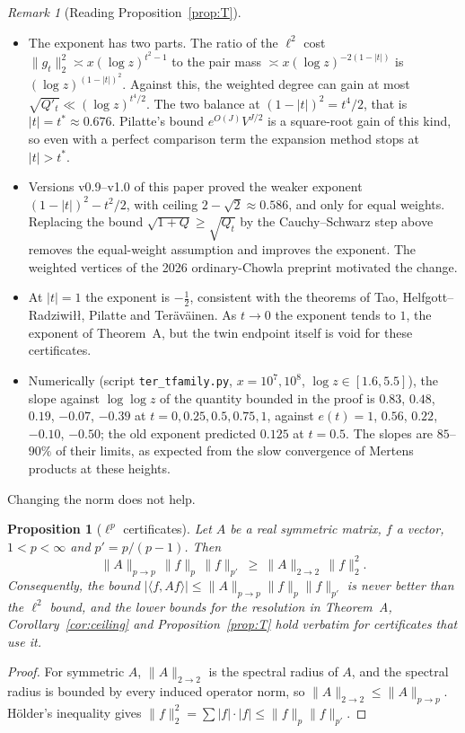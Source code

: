 \documentclass[11pt]{amsart}
\newtheorem{proposition}[theorem]{Proposition}
\theoremstyle{definition}
\theoremstyle{remark}
\newtheorem{remark}[theorem]{Remark}
\begin{document}
\begin{remark}[Reading Proposition~\ref{prop:T}]\label{rem:T}
\leavevmode
\begin{itemize}
\item The exponent has two parts. The ratio of the $\ell^2$ cost $\|g_t\|_2^2\asymp x(\log z)^{t^2-1}$ to the pair mass $\asymp x(\log z)^{-2(1-|t|)}$ is $(\log z)^{(1-|t|)^2}$. Against this, the weighted degree can gain at most $\sqrt{Q'_t}\ll(\log z)^{t^4/2}$. The two balance at $(1-|t|)^2=t^4/2$, that is $|t|=t^*\approx0.676$. Pilatte's bound $e^{O(J)}V^{J/2}$ is a square-root gain of this kind, so even with a perfect comparison term the expansion method stops at $|t|>t^*$.
\item Versions v0.9--v1.0 of this paper proved the weaker exponent $(1-|t|)^2-t^2/2$, with ceiling $2-\sqrt2\approx0.586$, and only for equal weights. Replacing the bound $\sqrt{1+Q}\ge\sqrt{Q_t}$ by the Cauchy--Schwarz step above removes the equal-weight assumption and improves the exponent. The weighted vertices of the 2026 ordinary-Chowla preprint \cite{OpenAI26} motivated the change.
\item At $|t|=1$ the exponent is $-\frac12$, consistent with the theorems of Tao, Helfgott--Radziwi\l{}\l{}, Pilatte and Teräväinen. As $t\to0$ the exponent tends to $1$, the exponent of Theorem~A, but the twin endpoint itself is void for these certificates.
\item Numerically (script \texttt{ter\_tfamily.py}, $x=10^7,10^8$, $\log z\in[1.6,5.5]$), the slope against $\log\log z$ of the quantity bounded in the proof is $0.83$, $0.48$, $0.19$, $-0.07$, $-0.39$ at $t=0,0.25,0.5,0.75,1$, against $e(t)=1$, $0.56$, $0.22$, $-0.10$, $-0.50$; the old exponent predicted $0.125$ at $t=0.5$. The slopes are $85$--$90\%$ of their limits, as expected from the slow convergence of Mertens products at these heights.
\end{itemize}
\end{remark}

Changing the norm does not help.

\begin{proposition}[$\ell^p$ certificates]\label{prop:L}
Let $A$ be a real symmetric matrix, $f$ a vector, $1<p<\infty$ and $p'=p/(p-1)$. Then
\[
\|A\|_{p\to p}\,\|f\|_p\,\|f\|_{p'}\ \ge\ \|A\|_{2\to2}\,\|f\|_2^2 .
\]
Consequently, the bound $|\langle f,Af\rangle|\le\|A\|_{p\to p}\|f\|_p\|f\|_{p'}$ is never better than the $\ell^2$ bound, and the lower bounds for the resolution in Theorem~A, Corollary~\ref{cor:ceiling} and Proposition~\ref{prop:T} hold verbatim for certificates that use it.
\end{proposition}
\begin{proof}
For symmetric $A$, $\|A\|_{2\to2}$ is the spectral radius of $A$, and the spectral radius is bounded by every induced operator norm, so $\|A\|_{2\to2}\le\|A\|_{p\to p}$. Hölder's inequality gives $\|f\|_2^2=\sum|f|\cdot|f|\le\|f\|_p\|f\|_{p'}$.
\end{proof}
\end{document}
